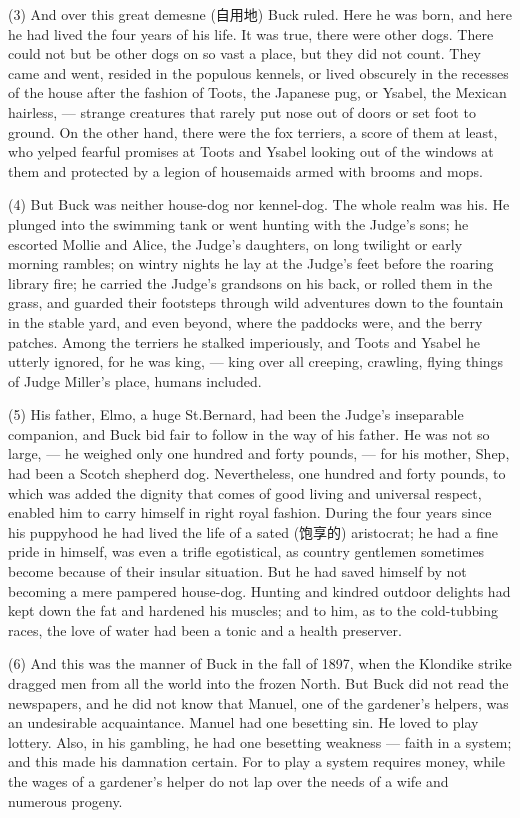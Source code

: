 \documentclass[UTF8,11pt]{ctexart}
\begin{document}
(3) And over this great demesne (自用地) Buck ruled. Here he was born, and here he had lived the four years of his life. It was true, there were other dogs. There could not but be other dogs on so vast a place, but they did not count. They came and went, resided in the populous kennels, or lived obscurely in the recesses of the house after the fashion of Toots, the Japanese pug, or Ysabel, the Mexican hairless, — strange creatures that rarely put nose out of doors or set foot to ground. On the other hand, there were the fox terriers, a score of them at least, who yelped fearful promises at Toots and Ysabel looking out of the windows at them and protected by a legion of housemaids armed with brooms and mops.


(4) But Buck was neither house-dog nor kennel-dog. The whole realm was his. He plunged into the swimming tank or went hunting with the Judge’s sons; he escorted Mollie and Alice, the Judge’s daughters, on long twilight or early morning rambles; on wintry nights he lay at the Judge’s feet before the roaring library fire; he carried the Judge's grandsons on his back, or rolled them in the grass, and guarded their footsteps through wild adventures down to the fountain in the stable yard, and even beyond, where the paddocks were, and the berry patches. Among the terriers he stalked imperiously, and Toots and Ysabel he utterly ignored, for he was king, — king over all creeping, crawling, flying things of Judge Miller’s place, humans included.


(5) His father, Elmo, a huge St.Bernard, had been the Judge’s inseparable companion, and Buck bid fair to follow in the way of his father. He was not so large, — he weighed only one hundred and forty pounds, — for his mother, Shep, had been a Scotch shepherd dog. Nevertheless, one hundred and forty pounds, to which was added the dignity that comes of good living and universal respect, enabled him to carry himself in right royal fashion. During the four years since his puppyhood he had lived the life of a sated (饱享的) aristocrat; he had a fine pride in himself, was even a trifle egotistical, as country gentlemen sometimes become because of their insular situation. But he had saved himself by not becoming a mere pampered house-dog. Hunting and kindred outdoor delights had kept down the fat and hardened his muscles; and to him, as to the cold-tubbing races, the love of water had been a tonic and a health preserver.


(6) And this was the manner of Buck in the fall of 1897, when the Klondike strike dragged men from all the world into the frozen North. But Buck did not read the newspapers, and he did not know that Manuel, one of the gardener's helpers, was an undesirable acquaintance. Manuel had one besetting sin. He loved to play lottery. Also, in his gambling, he had one besetting weakness — faith in a system; and this made his damnation certain. For to play a system requires money, while the wages of a gardener’s helper do not lap over the needs of a wife and numerous progeny.
\end{document}
